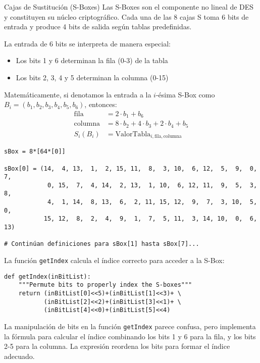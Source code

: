 \begin{cryptoanalysis}{Cajas de Sustitución (S-Boxes)}
	Las S-Boxes son el componente no lineal de DES y constituyen su núcleo criptográfico. Cada una de las 8 cajas S toma 6 bits de entrada y produce 4 bits de salida según tablas predefinidas.

	La entrada de 6 bits se interpreta de manera especial:
	\begin{itemize}
		\item Los bits 1 y 6 determinan la fila (0-3) de la tabla
		\item Los bits 2, 3, 4 y 5 determinan la columna (0-15)
	\end{itemize}

	Matemáticamente, si denotamos la entrada a la $i$-ésima S-Box como $B_i = (b_1, b_2, b_3, b_4, b_5, b_6)$, entonces:
	\begin{align}
		\text{fila}    & = 2 \cdot b_1 + b_6                                \\
		\text{columna} & = 8 \cdot b_2 + 4 \cdot b_3 + 2 \cdot b_4 + b_5    \\
		S_i(B_i)       & = \text{ValorTabla}_{i,\text{fila},\text{columna}}
	\end{align}
\end{cryptoanalysis}

\begin{lstlisting}[style=cryptoalgo, caption={Definición de S-Boxes}, label=lst:sboxes]
sBox = 8*[64*[0]]

sBox[0] = (14,  4, 13,  1,  2, 15, 11,  8,  3, 10,  6, 12,  5,  9,  0,  7,
            0, 15,  7,  4, 14,  2, 13,  1, 10,  6, 12, 11,  9,  5,  3,  8,
            4,  1, 14,  8, 13,  6,  2, 11, 15, 12,  9,  7,  3, 10,  5,  0,
           15, 12,  8,  2,  4,  9,  1,  7,  5, 11,  3, 14, 10,  0,  6, 13)

# Continúan definiciones para sBox[1] hasta sBox[7]...
\end{lstlisting}

La función \texttt{getIndex} calcula el índice correcto para acceder a la S-Box:

\begin{lstlisting}[style=cryptoalgo]
def getIndex(inBitList):
    """Permute bits to properly index the S-boxes"""
    return (inBitList[0]<<5)+(inBitList[1]<<3)+ \
           (inBitList[2]<<2)+(inBitList[3]<<1)+ \
           (inBitList[4]<<0)+(inBitList[5]<<4)
\end{lstlisting}

\begin{securitywarning}
	La manipulación de bits en la función \texttt{getIndex} parece confusa, pero implementa la fórmula para calcular el índice combinando los bits 1 y 6 para la fila, y los bits 2-5 para la columna. La expresión reordena los bits para formar el índice adecuado.
\end{securitywarning}

